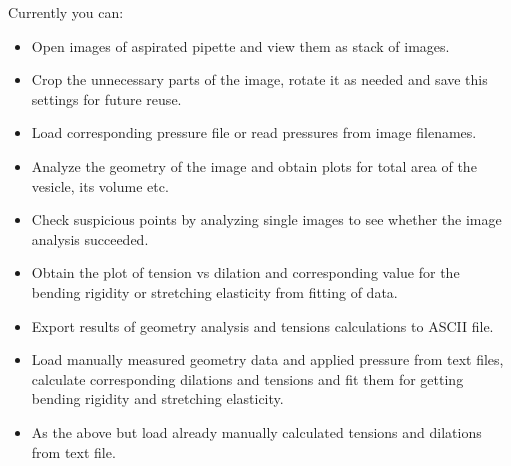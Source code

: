 Currently you can:
\begin{itemize}
	\item Open images of aspirated pipette and view them as stack of images.
	\item Crop the unnecessary parts of the image, rotate it as needed and save this settings for future reuse.
	\item Load corresponding pressure file or read pressures from image filenames.
	\item Analyze the geometry of the image and obtain plots for total area of the vesicle, its volume etc.
	\item Check suspicious points by analyzing single images to see whether the image analysis succeeded.
	\item Obtain the plot of tension vs dilation and corresponding value for the bending rigidity or stretching elasticity from fitting of data.
	\item Export results of geometry analysis and tensions calculations to ASCII file.
	\item Load manually measured geometry data and applied pressure from text files, calculate corresponding dilations and tensions and fit them for getting bending rigidity and stretching elasticity.
	\item As the above but load already manually calculated tensions and dilations from text file.
\end{itemize}

